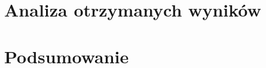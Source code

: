 \documentclass{wfiisul}
\begin{document}







\chapter{Analiza otrzymanych wyników}

\chapter{Podsumowanie}

\listoftables
\listoffigures


\end{document}
